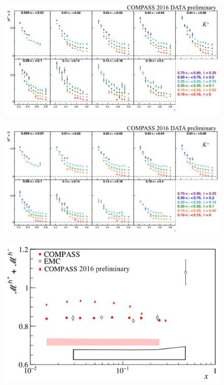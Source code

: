 \documentclass[letterpaper,12pt]{article}
\begin{document}
\begin{figure}
	\includegraphics[scale=0.5]{./gfx/Kp.png}
	\caption{}
	\label{Kp}
\end{figure}

\newpage

\begin{figure}
	\includegraphics[scale=0.5]{./gfx/Km.png}
	\caption{}
	\label{Km}
\end{figure}

\newpage

\begin{figure}[H]
	\includegraphics[scale=0.38]{./gfx/hs.png}
	\caption{}
	\label{hs}
\end{figure}
\end{document}
